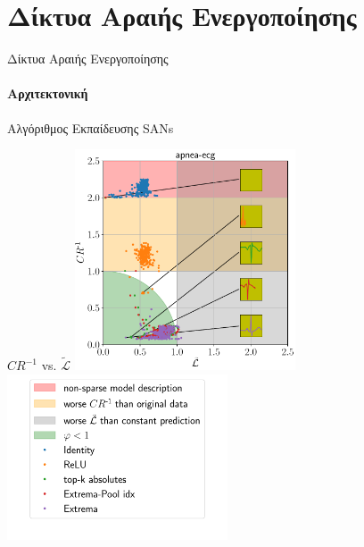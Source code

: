 \documentclass{beamer}
\begin{document}
\section{Δίκτυα Αραιής Ενεργοποίησης}
\begin{frame}[c]{Δίκτυα Αραιής Ενεργοποίησης}
	\framesubtitle{Αρχιτεκτονική}
	\begin{figure}
		\begin{tikzpicture}[scale=0.6]
			
		\end{tikzpicture}
		\qquad
		\begin{tikzpicture}[scale=0.6]
			
		\end{tikzpicture}
	\end{figure}
\end{frame}

\begin{frame}[c]{Αλγόριθμος Εκπαίδευσης \textlatin{SANs}}
	\begin{center}
	\end{center}
\end{frame}

\begin{frame}[c]{$CR^{-1}$ \textlatin{vs}. $\tilde{\mathcal{L}}$}
	\includegraphics[width=0.49\textwidth]{"images_mean_inverse_compression_ratio_vs_mean_reconstruction_loss_variable_kernel_size_list/apnea-ecg"}
	\includegraphics[width=0.49\textwidth]{"images_mean_inverse_compression_ratio_vs_mean_reconstruction_loss_variable_kernel_size_list/legend"}
\end{frame}
\end{document}
